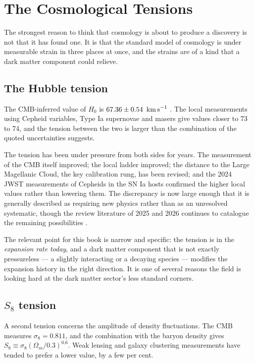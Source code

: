 
\chapter{The Cosmological Tensions}
\label{ch:tensions}

The strongest reason to think that cosmology is about to produce a discovery
is not that it has found one. It is that the standard model of cosmology is
under measurable strain in three places at once, and the strains are of a
kind that a dark matter component could relieve.

\section{The Hubble tension}The CMB-inferred value of $H_0$ is
$67.36 \pm 0.54\ \,\mathrm{km\,s}^{-1}$ . The local measurements
using Cepheid variables, Type Ia supernovae and masers give values closer to
73 to 74, and the tension between the two is larger than the combination of
the quoted uncertainties suggests.

The tension has been under pressure from both sides for years. The
measurement of the CMB itself improved; the local ladder improved; the
distance to the Large Magellanic Cloud, the key calibration rung, has been
revised; and the 2024 JWST measurements of Cepheids in the SN Ia hosts
confirmed the higher local values rather than lowering them. The
discrepancy is now large enough that it is generally described as requiring
new physics rather than as an unresolved systematic, though the review
literature of 2025 and 2026 continues to catalogue the remaining
possibilities .

The relevant point for this book is narrow and specific: the tension is in
the \emph{expansion rate today}, and a dark matter component that is not
exactly pressureless --- a slightly interacting or a decaying species ---
modifies the expansion history in the right direction. It is one of several
reasons the field is looking hard at the dark matter sector's less standard
corners.

\section{\texorpdfstring{$S_8$}{S8} tension}A second tension concerns the amplitude of density
fluctuations. The CMB measures $\sigma_8 = 0.811$, and the combination with
the baryon density gives $S_8 \equiv \sigma_8 (\Omega_m/0.3)^{0.6}$. Weak
lensing and galaxy clustering measurements have tended to prefer a lower
value, by a few per cent.

